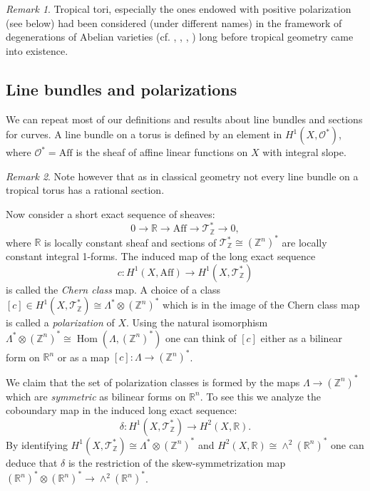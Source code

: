 \documentclass[12pt]{amsart}
\theoremstyle{plain}
\theoremstyle{definition}
\theoremstyle{remark}
\newtheorem*{remark}{Remark}
\newcommand{\Z}{\mathbb Z}    %
\newcommand{\R}{\mathbb R}    %
\newcommand{\Aff}{\operatorname{Af{}f}}
\renewcommand{\O}{\mathcal O}   %
\newcommand{\<}{\langle}   %
\renewcommand{\>}{\rangle} %
\begin{document}
\begin{remark}
Tropical tori, especially the ones endowed with positive polarization (see below) had been considered (under different names) in the framework of degenerations of Abelian varieties (cf. \cite{Mumford_abelian_varieties}, \cite{Chai-Faltings},  \cite{Alexeev-Nakamura}, \cite{Alexeev}) long before tropical geometry came into existence.
\end{remark}


\subsection{Line bundles and polarizations} We can repeat most
of our definitions and results about line bundles and sections
for curves.  A line bundle on a torus is defined by an
element in $H^1(X,\O^*)$, where $\O^*=\Aff$ is the sheaf of affine
linear functions on $X$ with integral slope.

\begin{remark}
Note however that as in classical geometry not every line bundle on a tropical torus has a rational section.
\end{remark}

Now consider a short exact sequence of sheaves:
\begin{equation}
0 \longrightarrow \R  \longrightarrow \Aff  \longrightarrow {\mathcal T}^*_\Z \longrightarrow 0,
\end{equation}
where $\R$ is locally constant sheaf and sections of ${\mathcal T}^*_\Z \cong (\Z^n)^*$
are locally constant  integral 1-forms.
The induced map of the long exact sequence
\begin{equation}
c: H^1(X,\Aff) \longrightarrow H^1(X,{\mathcal T}^*_\Z)
\end{equation}
is called the {\em Chern class} map. A choice of a class $[c]\in H^1(X,{\mathcal T}^*_\Z)
\cong \Lambda^*\otimes (\Z^n)^*$ which is in the image of the Chern class map
is called a {\em polarization} of $X$. Using the natural isomorphism
$\Lambda^*\otimes (\Z^n)^*\cong \operatorname{Hom}(\Lambda, (\Z^n)^*)$ one can
think of $[c]$ either as a bilinear form on $\R^n$ or as a map
$[c]:\Lambda\to(\Z^n)^*$.

We claim that the set of polarization classes is formed by the maps
$\Lambda\to(\Z^n)^*$ which are {\em symmetric} as bilinear forms on
$\R^n$. To see this we analyze the coboundary map in the induced
long exact sequence:
\begin{equation}
\delta: H^1(X,{\mathcal T}^*_\Z) \longrightarrow H^2(X,\R).
\end{equation}
By identifying $H^1(X,{\mathcal T}^*_\Z) \cong \Lambda^*\otimes (\Z^n)^*$ and
$H^2(X,\R)\cong \wedge^2 (\R^n)^*$ one can deduce that $\delta$ is the
restriction of the skew-symmetrization map $(\R^n)^*\otimes (\R^n)^* \to
\wedge^2 (\R^n)^*$.
\end{document}
